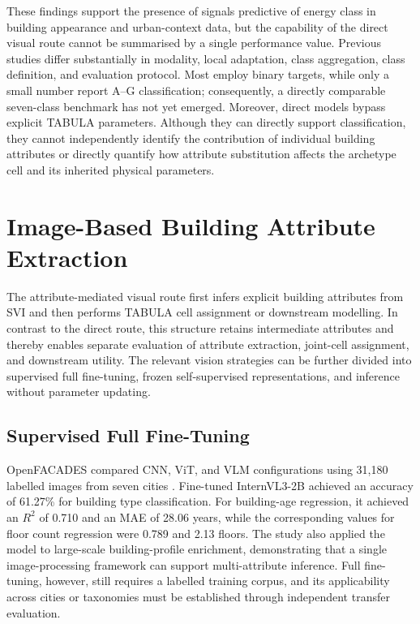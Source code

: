 These findings support the presence of signals predictive of energy class in building appearance and urban-context data, but the capability of the direct visual route cannot be summarised by a single performance value.
Previous studies differ substantially in modality, local adaptation, class aggregation, class definition, and evaluation protocol.
Most employ binary targets, while only a small number report A--G classification; consequently, a directly comparable seven-class benchmark has not yet emerged.
Moreover, direct models bypass explicit TABULA parameters.
Although they can directly support classification, they cannot independently identify the contribution of individual building attributes or directly quantify how attribute substitution affects the archetype cell and its inherited physical parameters.

\section{Image-Based Building Attribute Extraction}
\label{sec:image_based_attribute_extraction}

The attribute-mediated visual route first infers explicit building attributes from \ac{SVI} and then performs TABULA cell assignment or downstream modelling.
In contrast to the direct route, this structure retains intermediate attributes and thereby enables separate evaluation of attribute extraction, joint-cell assignment, and downstream utility.
The relevant vision strategies can be further divided into supervised full fine-tuning, frozen self-supervised representations, and inference without parameter updating.

\subsection{Supervised Full Fine-Tuning}
\label{sec:supervised_full_finetuning}

OpenFACADES compared \ac{CNN}, \acf{ViT}, and \ac{VLM} configurations using 31,180 labelled images from seven cities \parencite{liang2025}.
Fine-tuned InternVL3-2B achieved an accuracy of 61.27\% for building type classification.
For building-age regression, it achieved an $R^2$ of 0.710 and an MAE of 28.06 years, while the corresponding values for floor count regression were 0.789 and 2.13 floors.
The study also applied the model to large-scale building-profile enrichment, demonstrating that a single image-processing framework can support multi-attribute inference.
Full fine-tuning, however, still requires a labelled training corpus, and its applicability across cities or taxonomies must be established through independent transfer evaluation.

